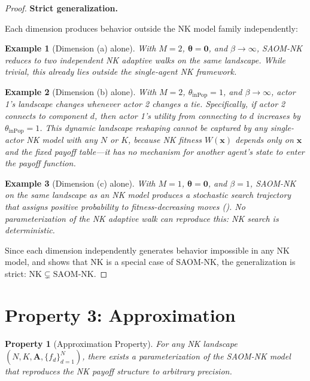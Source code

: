 \documentclass[12pt]{article}
\newtheorem{property}{Property}
\newtheorem{example}{Example}
\newcommand{\bx}{\mathbf{x}}
\newcommand{\bA}{\mathbf{A}}
\newcommand{\btheta}{\boldsymbol{\theta}}
\begin{document}
\begin{proof}
\medskip
\noindent\textbf{Strict generalization.}

Each dimension produces behavior outside the NK model family independently:

\begin{example}[Dimension (a) alone]
With $M = 2$, $\btheta = \mathbf{0}$, and $\beta \to \infty$, SAOM-NK
reduces to two independent NK adaptive walks on the same landscape. While
trivial, this already lies outside the single-agent NK framework.
\end{example}

\begin{example}[Dimension (b) alone]
With $M = 2$, $\theta_{\mathrm{inPop}} = 1$, and $\beta \to \infty$, actor
1's landscape changes whenever actor 2 changes a tie. Specifically, if actor
2 connects to component $d$, then actor 1's utility from connecting to $d$
increases by $\theta_{\mathrm{inPop}} = 1$. This dynamic landscape
reshaping cannot be captured by \emph{any} single-actor NK model with any
$N$ or $K$, because NK fitness $W(\bx)$ depends only on $\bx$ and the fixed
payoff table---it has no mechanism for another agent's state to enter the
payoff function.
\end{example}

\begin{example}[Dimension (c) alone]
With $M = 1$, $\btheta = \mathbf{0}$, and $\beta = 1$, SAOM-NK on the same
landscape as an NK model produces a stochastic search trajectory that
assigns positive probability to fitness-decreasing moves
(). No parameterization of the NK adaptive walk
can reproduce this: NK search is deterministic.
\end{example}

Since each dimension independently generates behavior impossible in any NK
model, and  shows that NK is a special case of SAOM-NK,
the generalization is strict: $\mathrm{NK} \subsetneq \text{SAOM-NK}$.
\end{proof}

\section{Property 3: Approximation}
\label{sec:approximation}

\begin{property}[Approximation Property]
\label{property:approximation}
For any NK landscape $(N, K, \bA, \{f_d\}_{d=1}^N)$, there exists a
parameterization of the SAOM-NK model that reproduces the NK payoff structure to
arbitrary precision.
\end{property}
\end{document}
